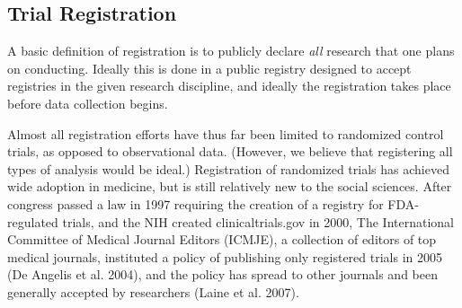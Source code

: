 \documentclass[12pt] {article}
\begin{document}
\subsection{Trial Registration}\label{trial-registration}

A basic definition of registration is to publicly declare \emph{all}
research that one plans on conducting. Ideally this is done in a public
registry designed to accept registries in the given research discipline,
and ideally the registration takes place before data collection begins.

Almost all registration efforts have thus far been limited to randomized
control trials, as opposed to observational data. (However, we believe
that registering all types of analysis would be ideal.) Registration of
randomized trials has achieved wide adoption in medicine, but is still
relatively new to the social sciences. After congress passed a law in
1997 requiring the creation of a registry for FDA-regulated trials, and
the NIH created clinicaltrials.gov in 2000, The International Committee
of Medical Journal Editors (ICMJE), a collection of editors of top
medical journals, instituted a policy of publishing only registered
trials in 2005 (De Angelis et al. 2004), and the policy has spread to
other journals and been generally accepted by researchers (Laine et al.
2007).
\end{document}
